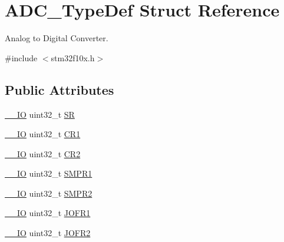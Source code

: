 \hypertarget{struct_a_d_c___type_def}{\section{A\-D\-C\-\_\-\-Type\-Def Struct Reference}
\label{struct_a_d_c___type_def}
}


Analog to Digital Converter.  




{\ttfamily \#include $<$stm32f10x.\-h$>$}

\subsection*{Public Attributes}
\begin{DoxyCompactItemize}
\item 
\hyperlink{group___c_m_s_i_s__core__definitions_gaec43007d9998a0a0e01faede4133d6be}{\-\_\-\-\_\-\-I\-O} uint32\-\_\-t \hyperlink{struct_a_d_c___type_def_a9745df96e98f3cdc2d05ccefce681f64}{S\-R}
\item 
\hyperlink{group___c_m_s_i_s__core__definitions_gaec43007d9998a0a0e01faede4133d6be}{\-\_\-\-\_\-\-I\-O} uint32\-\_\-t \hyperlink{struct_a_d_c___type_def_a89b1ff4376683dd2896ea8b32ded05b2}{C\-R1}
\item 
\hyperlink{group___c_m_s_i_s__core__definitions_gaec43007d9998a0a0e01faede4133d6be}{\-\_\-\-\_\-\-I\-O} uint32\-\_\-t \hyperlink{struct_a_d_c___type_def_a1053a65a21af0d27afe1bf9cf7b7aca7}{C\-R2}
\item 
\hyperlink{group___c_m_s_i_s__core__definitions_gaec43007d9998a0a0e01faede4133d6be}{\-\_\-\-\_\-\-I\-O} uint32\-\_\-t \hyperlink{struct_a_d_c___type_def_a73009a8122fcc628f467a4e997109347}{S\-M\-P\-R1}
\item 
\hyperlink{group___c_m_s_i_s__core__definitions_gaec43007d9998a0a0e01faede4133d6be}{\-\_\-\-\_\-\-I\-O} uint32\-\_\-t \hyperlink{struct_a_d_c___type_def_a9e68fe36c4c8fbbac294b5496ccf7130}{S\-M\-P\-R2}
\item 
\hyperlink{group___c_m_s_i_s__core__definitions_gaec43007d9998a0a0e01faede4133d6be}{\-\_\-\-\_\-\-I\-O} uint32\-\_\-t \hyperlink{struct_a_d_c___type_def_aa005e656f528aaad28d70d61c9db9b81}{J\-O\-F\-R1}
\item 
\hyperlink{group___c_m_s_i_s__core__definitions_gaec43007d9998a0a0e01faede4133d6be}{\-\_\-\-\_\-\-I\-O} uint32\-\_\-t \hyperlink{struct_a_d_c___type_def_aa20f76044c11042dde41c1060853fb82}{J\-O\-F\-R2}
\item 

\end{DoxyCompactItemize}

